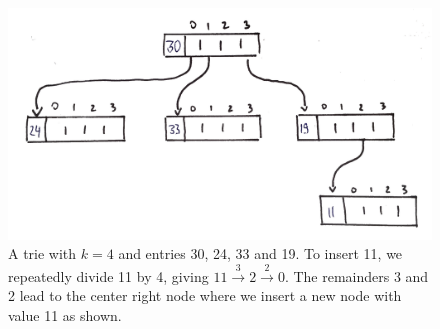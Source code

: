 
\begin{figure}
	\centering
	\includegraphics[width=\textwidth]{topic/imgtries/sampletrie_drawn_transp}
	\caption{ \small A trie with $k = 4$ and entries 30, 24, 33 and 19.
		To insert 11, we repeatedly divide 11 by 4, giving
			$11 \overset{3}{\longrightarrow} 2  \overset{2}{\longrightarrow} 0$.
		The remainders 3 and 2 lead to the center right node where we insert a new node with value 11 as shown.}
\end{figure}


